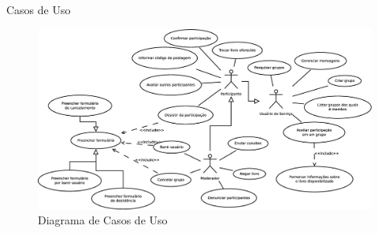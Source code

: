 \documentclass{beamer}
\begin{document}
\begin{frame}{Casos de Uso}
 \begin{figure}
  \includegraphics[width=\textwidth]{casosDeUso.eps}
  \caption{Diagrama de Casos de Uso}  
 \end{figure} 
\end{frame}
\end{document}
